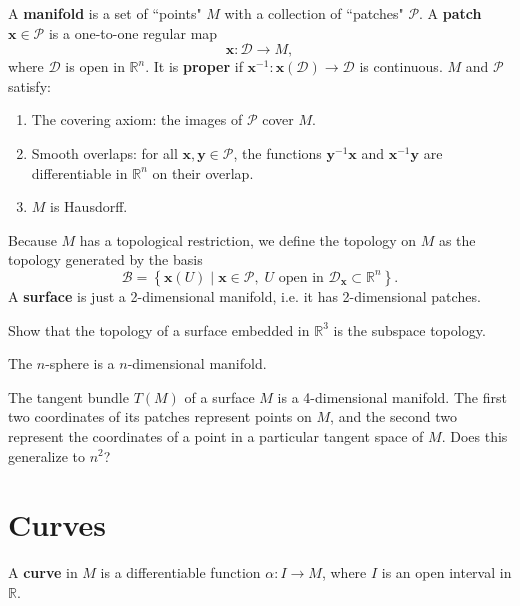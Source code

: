 \documentclass[10pt]{report}
\begin{document}
\begin{defn}[]
A \textbf{manifold} is a set of ``points" $M$ with a collection of ``patches" $\mathcal{P}$. A \textbf{patch} $\mathbf{x} \in \mathcal{P}$ is a one-to-one regular map
\[
\mathbf{x}:\mathcal{D}\to M,
\] where $\mathcal{D}$ is open in $\mathbb{R}^n$. {\color{red}It is \textbf{proper} if $\mathbf{x}^{-1}:\mathbf{x}(\mathcal{D})\to \mathcal{D}$ is continuous.} $M$ and $\mathcal{P}$ satisfy:
\begin{enumerate}
	\item The covering axiom: the images of $\mathcal{P}$ cover $M$.
	\item Smooth overlaps: for all $\mathbf{x},\mathbf{y} \in \mathcal{P}$, the functions $\mathbf{y}^{-1}\mathbf{x}$ and $\mathbf{x}^{-1}\mathbf{y}$ are differentiable in $\mathbb{R}^n$ on their overlap.
	\item $M$ is Hausdorff.
\end{enumerate}
\end{defn}

Because $M$ has a topological restriction, we define the topology on $M$ as the topology generated by the basis
\[
	\mathcal{B} = \left\{ \mathbf{x}(U) \;|\; \mathbf{x} \in \mathcal{P},\; U \text{ open in } \mathcal{D}_{\mathbf{x}} \subset \mathbb{R}^n \right\}.
\] 
A \textbf{surface} is just a 2-dimensional manifold, i.e. it has 2-dimensional patches.

{\color{red}Show that the topology of a surface embedded in $\mathbb{R}^3$ is the subspace topology.}

\begin{ex}[]
The $n$-sphere is a $n$-dimensional manifold.
\end{ex}

\begin{ex}[]
	The tangent bundle $T(M)$ of a surface $M$ is a 4-dimensional manifold. The first two coordinates of its patches represent points on $M$, and the second two represent the coordinates of a point in a particular tangent space of $M$. {\color{red}Does this generalize to $n^2$?}
\end{ex}


\section{Curves}

\begin{defn}
A \textbf{curve} in $M$ is a differentiable function $\alpha:I\to M$, where $I$ is an open interval in $\mathbb{R}$.
\end{defn}
\end{document}
